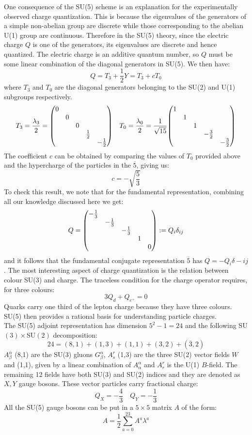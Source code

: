 \documentclass[../main.tex]{subfiles}
\begin{document}
One consequence of the SU(5) scheme is an explanation for the experimentally observed charge quantization. This is because the eigenvalues of the generators of a simple non-abelian group are discrete while those corresponding to the abelian U(1) group are continuous. Therefore in the SU(5) theory, since the electric charge $Q$ is one of the generators, its eigenvalues are discrete and hence quantized. The electric charge is an additive quantum number, so $Q$ must be some linear combination of the diagonal generators in SU(5). We then have:
\[
Q=T_3+\frac{1}{2}Y=T_3+cT_0
\]
where $T_3$ and $T_0$ are the diagonal generators belonging to the SU(2) and U(1) subgroups respectively.
\[
T_3=\frac{\lambda_3}{2}=\mqty(\dmat{0,0,0,\frac{1}{2},-\frac{1}{2}}) \quad T_0=\frac{\lambda_0}{2}=\frac{1}{\sqrt{15}}\mqty(\dmat{1,1,1,-\frac{3}{2},-\frac{3}{2}})
\]
The coefficient $c$ can be obtained by comparing the values of $T_0$ provided above and the hypercharge of the particles in the $\overline{5}$, giving us:
\[
c=-\sqrt{\frac{5}{3}}
\]
To check this result, we note that for the fundamental representation, combining all our knowledge discussed here we get:
\[
Q=\mqty(\dmat{-\frac{1}{3},-\frac{1}{3},-\frac{1}{3},1,0}):=Q_i\delta_{ij}
\]
and it follows that the fundamental conjugate representation $\overline{5}$ has $Q=-Q_i\delta-{ij}$. The most interesting aspect of charge quantization is the relation between colour SU(3) and charge. The traceless condition for the charge operator requires, for three colours:
\[
3Q_d+Q_{e^+}=0
\]
Quarks carry one third of the lepton charge because they have three colours. SU(5) then provides a rational basis for understanding particle charges.\\
The SU(5) adjoint representation has dimension $5^2-1=24$ and the following SU$(3)\times$SU$(2)$ decomposition:
\[
24=(8,1)+(1,3)+(1,1)+(3,2)+(\overline{3},2)
\]
$A_\beta^\alpha$ (8,1) are the SU(3) gluons $G_\beta^\alpha$, $A_s^r$ (1,3) are the three SU(2) vector fields $W$ and (1,1), given by a linear combination of $A_\alpha^\alpha$ and $A_r^r$ is the U(1) $B$-field. The remaining 12 fields have both SU(3) and SU(2) indices and they are denoted as $X,Y$ gauge bosons. These vector particles carry fractional charge:
\[
Q_X=-\frac{4}{3} \quad Q_Y=-\frac{1}{3}
\]
All the SU(5) gauge bosons can be put in a $5\times5$ matrix $A$ of the form:
\[
A=\frac{1}{2}\sum_{a=0}^{23}A^a\lambda^a
\]
\end{document}

